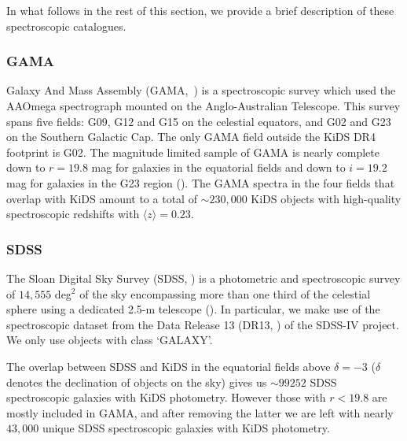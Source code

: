 \documentclass[fleqn,usenatbib,useAMS]{mnras}
\begin{document}

In what follows in the rest of this section, we provide a brief description of these spectroscopic catalogues.

\subsubsection{GAMA}
Galaxy And Mass Assembly (GAMA,~\citealt{driver2011}) is a spectroscopic survey  which used the AAOmega spectrograph mounted on the Anglo-Australian Telescope. This survey spans five fields: G09, G12 and G15 on the celestial equators, and G02 and G23 on the Southern Galactic Cap. The only GAMA field outside the KiDS DR4 footprint is G02. The magnitude limited sample of GAMA is nearly complete down to $r=19.8$ mag for galaxies in the equatorial fields and down to $i=19.2$ mag for galaxies in the G23 region (\citealt{likse2015}). The GAMA spectra in the four fields that overlap with KiDS amount to a total of $\sim 230,000$ KiDS objects with high-quality spectroscopic redshifts with $\langle z \rangle = 0.23$. 

\subsubsection{SDSS}

The Sloan Digital Sky Survey (SDSS, \citealt{york2000}) is a photometric and spectroscopic survey of $14,555$ deg$^2$ of the sky encompassing more than one third of the celestial sphere using a dedicated 2.5-m telescope (\citealt{gunn2006}). In particular, we make use of the spectroscopic dataset from the Data Release 13 (DR13, \citealt{sdss_dr13}) of the SDSS-IV project. We only use objects with class `GALAXY'. 

The overlap between SDSS and KiDS in the equatorial fields above $\delta =-3$ ($\delta$ denotes the declination of objects on the sky) gives us $\sim 99252$ SDSS spectroscopic galaxies with KiDS photometry. However those with $r<19.8$ are mostly included in GAMA, and after removing the latter we are left with nearly $43,000$ unique SDSS spectroscopic galaxies with KiDS photometry. 
\end{document}
